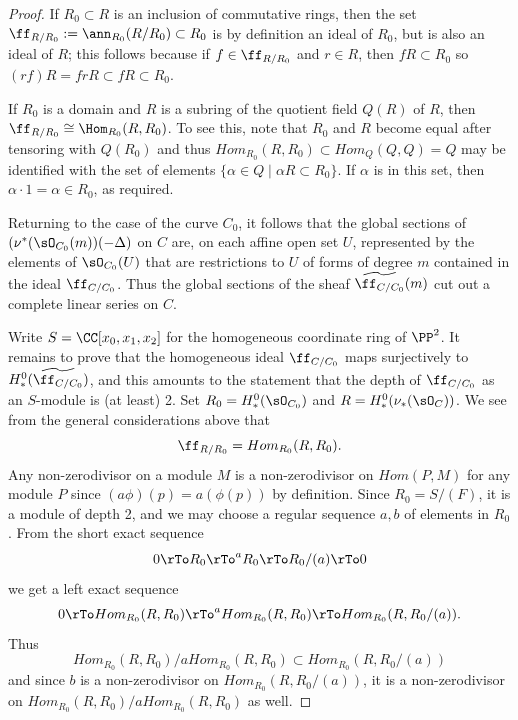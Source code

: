 \begin{proof}
If $R_{0}\subset R$ is an inclusion of commutative rings, then the set
$\ff_{R/R_{0}} := \ann_{R_{0}}(R/R_{0})\subset R_{0}$ is by definition an ideal of $R_{0}$, but is also an ideal of $R$; this follows
because if $f\in \ff_{R/R_{0}}$ and $r\in R$, then $fR\subset R_{0}$ so
 $(rf)R = frR \subset fR \subset R_{0}$. 

If $R_{0}$ is a domain and $R$ is a subring of the quotient field $Q(R)$ of $R$, then
 $\ff_{R/R_{0}} \cong \Hom_{R_{0}}(R, R_{0})$. To see this, note that $R_{0}$ and $R$ become
 equal after tensoring with $Q(R_{0})$ and thus 
 $Hom_{R_{0}}(R,R_{0}) \subset Hom_{Q}(Q,Q) = Q$ 
 may be identified
 with the set of elements $\{\alpha\in Q\mid \alpha R \subset R_{0}\}$. If $\alpha$ is in this set, then
  $\alpha\cdot 1 = \alpha \in R_{0}$, as required.
  
Returning to the case of the curve $C_{0}$, it follows that the global sections of $(\nu^{*}(\sO_{C_{0}}(m))( -\Delta)$ on $C$
are, on each affine open set $U$, represented by the elements of $\sO_{C_{0}}(U)$ that  are restrictions to $U$
of forms of degree $m$ contained in 
the ideal $\ff_{C/C_{0}}$. Thus
the global sections of the sheaf $\widetilde{\ff_{C/C_{0}}}(m)$ cut out a complete linear series on $C$.

Write $S =\CC[x_{0}, x_{1}, x_{2}]$ for the homogeneous coordinate ring of $\PP^{2}$.
It remains to prove that the homogeneous ideal $\ff_{C/C_{0}}$ maps
surjectively to $H^{0}_{*}(\widetilde{\ff_{C/C_{0}}})$, and this amounts to the
statement that the depth of $\ff_{C/C_{0}}$ as an $S$-module is (at least) 2.
Set $R_{0} = H^{0}_{*}(\sO_{C_{0}})$ and $R = H^{0}_{*}(\nu_{*} (\sO_{C}))$.
We see from the general considerations above that
$$
\ff_{R/R_{0}} = Hom_{R_{0}}(R, R_{0}).
$$ 
Any non-zerodivisor on a module $M$
is a non-zerodivisor on $Hom(P, M)$ for any module $P$ since $(a\phi)(p) = a(\phi(p))$ by definition. 
Since $R_{0} = S/(F)$, it is a module of depth 2, and we may choose a regular sequence
$a,b$ of elements in $R_{0}$. From the short exact sequence
$$
0\rTo R_{0}\rTo^{a} R_{0}\rTo R_{0}/(a) \rTo 0
$$
we get a left exact sequence
$$
0\rTo Hom_{R_{0}}(R,R_{0})\rTo^{a} Hom_{R_{0}}(R,R_{0})\rTo Hom_{R_{0}}(R,R_{0}/(a)).
$$
Thus 
$$
Hom_{R_{0}}(R,R_{0})/aHom_{R_{0}}(R,R_{0}) \subset Hom_{R_{0}}(R,R_{0}/(a))
$$
and since $b$ is a non-zerodivisor on $Hom_{R_{0}}(R,R_{0}/(a))$, it is a non-zerodivisor
on $Hom_{R_{0}}(R,R_{0})/aHom_{R_{0}}(R,R_{0})$ as well.
\end{proof}

